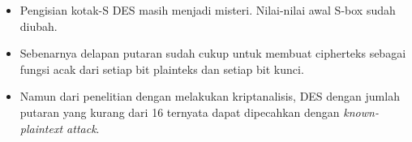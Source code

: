 \documentclass{article}
\begin{document}

\begin{itemize}
  \item Pengisian kotak-S DES masih menjadi misteri. Nilai-nilai awal S-box sudah diubah.
  \item Sebenarnya delapan putaran sudah cukup untuk membuat cipherteks sebagai fungsi acak dari setiap bit plainteks dan setiap bit kunci.
  \item Namun dari penelitian dengan melakukan kriptanalisis, DES dengan jumlah putaran yang kurang dari 16 ternyata dapat dipecahkan dengan \textit{known-plaintext attack}.
\end{itemize}
\end{document}
